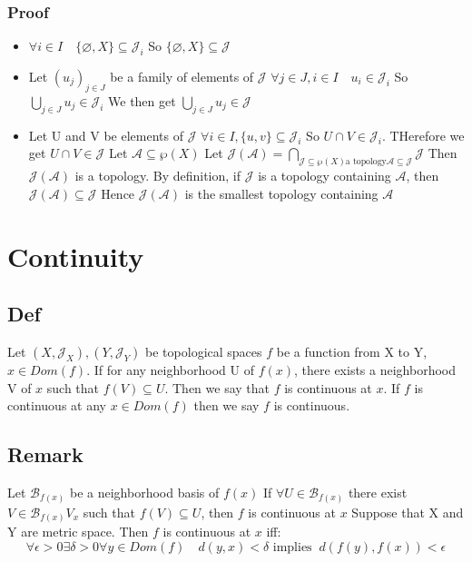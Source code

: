 \documentclass{book}
\begin{document}
\subsection{Proof}
\begin{itemize}
    \item $\forall i\in I\quad \{\varnothing,X\}\subseteq\mathcal{J}_i$ So $\{\varnothing,X\}\subseteq \mathcal{J}$
    \item Let $(u_j)_{j\in J}$ be a family of elements of $\mathcal{J}$ $\forall j\in J,i\in I\quad u_i\in \mathcal{J}_i$ So $\bigcup\limits_{j\in J}u_j\in \mathcal{J}_i$ We then get $\bigcup\limits_{j\in J} u_j \in \mathcal{J}$
    \item Let U and V be elements of $\mathcal{J}$ $\forall i\in I,\{u,v\}\subseteq \mathcal{J}_i$ So $U\cap V\in \mathcal{J}_i$. THerefore we get $U\cap V\in \mathcal{J}$ Let $\mathcal{A}\subseteq\wp(X)$ Let $\mathcal{J}(\mathcal{A})=\bigcap\limits_{\mathcal{J}\subseteq \wp(X)\text{a topology} \mathcal{A}\subseteq \mathcal{J}}\mathcal{J}$ Then $\mathcal{J}(\mathcal{A})$ is a topology. By definition, if $\mathcal{J}$ is a topology containing $\mathcal{A}$, then $\mathcal{J}(\mathcal{A})\subseteq\mathcal{J}$ Hence $\mathcal{J}(\mathcal{A})$ is the smallest topology containing $\mathcal{A}$
\end{itemize}

\chapter{Continuity}
\section{Def}
Let $(X,\mathcal{J}_X),(Y,\mathcal{J}_Y)$ be topological spaces $f$ be a function from X to Y, $x\in Dom (f)$. If for any neighborhood U of $f(x)$, there exists a neighborhood V of $x$ such that  $f(V)\subseteq U$. Then we say that $f$ is continuous at $x$. If $f$ is continuous at any $x\in Dom(f)$ then we say $f$ is continuous.
\section{Remark}
Let $\mathscr{B}_{f(x)}$ be a neighborhood basis of $f(x)$ If $\forall U\in \mathscr{B}_{f(x)}$ there exist $V\in \mathscr{B}_{f(x)}{V}_x$ such that $f(V)\subseteq U$, then $f$ is continuous at $x$
Suppose that X and Y are metric space. Then $f$ is continuous at $x$ iff:$$\forall \epsilon>0\exists \delta>0\forall y\in Dom(f)\quad d(y,x)<\delta \text{ implies }\ d(f(y),f(x))<\epsilon$$
\end{document}

